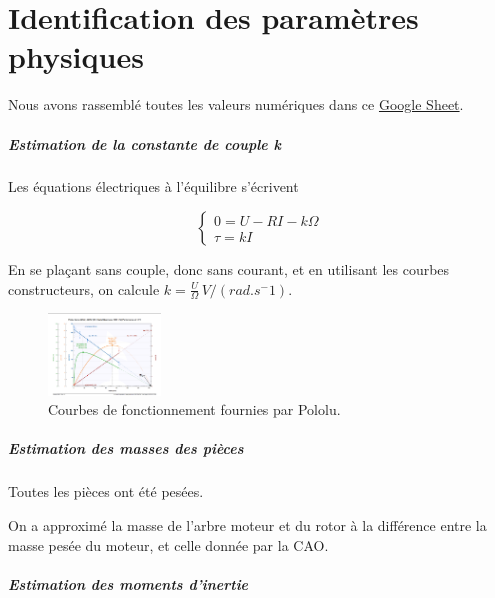 \documentclass{report}
\begin{document}
\chapter{Identification des paramètres physiques}

Nous avons rassemblé toutes les valeurs numériques dans ce 
\href{https://docs.google.com/spreadsheets/d/1PVCPAeFXgacQK3YaMxcYYtDlWB_0VT0cpRnJDznpAQc/edit?pli=1#gid=0
}{Google Sheet}.

\paragraph{Estimation de la constante de couple k}

Les équations électriques à l'équilibre s'écrivent

\begin{equation*}
    \begin{cases}
        0 = U - RI - k\Omega \\
        \tau = kI       
    \end{cases}
\end{equation*}

En se plaçant sans couple, donc sans courant, 
et en utilisant les courbes constructeurs, on calcule
$k=\frac{U}{\Omega} \, V/(rad.s^-1)$.

\begin{figure}[h]  %
    \centering
    \includegraphics[width=3cm]{figures/courbes-construc.png}
    \caption{Courbes de fonctionnement fournies par Pololu.}
\end{figure}

\paragraph{Estimation des masses des pièces}
Toutes les pièces ont été pesées.

On a approximé la masse de l'arbre moteur et du rotor à la différence
entre la masse pesée du moteur, et celle donnée par la CAO.

\paragraph{Estimation des moments d'inertie}
\end{document}
